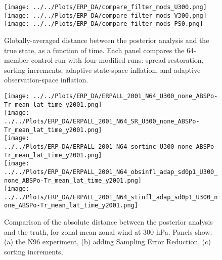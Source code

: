 \documentclass[11pt]{report}
\begin{document}
\begin{figure}
  \noindent
  \texttt{[image: ../../Plots/ERP\_DA/compare\_filter\_mods\_U300.png]} \\
  \texttt{[image: ../../Plots/ERP\_DA/compare\_filter\_mods\_V300.png]} \\
  \texttt{[image: ../../Plots/ERP\_DA/compare\_filter\_mods\_PS0.png]} 
   \caption{Globally-averaged distance between the posterior analysis and the true state, as a function of time.  Each panel compares the 64-member control run with four modified runs: spread restoration, sorting increments, adaptive state-space inflation, and adaptive observation-space inflation.}
   \label{fig:comp_mods_U300}
 \end{figure}


\begin{figure}
  \noindent
  \texttt{[image: ../../Plots/ERP\_DA/ERPALL\_2001\_N64\_U300\_none\_ABSPo-Tr\_mean\_lat\_time\_y2001.png]} \\
  \texttt{[image: ../../Plots/ERP\_DA/ERPALL\_2001\_N64\_SR\_U300\_none\_ABSPo-Tr\_mean\_lat\_time\_y2001.png]} \\
  \texttt{[image: ../../Plots/ERP\_DA/ERPALL\_2001\_N64\_sortinc\_U300\_none\_ABSPo-Tr\_mean\_lat\_time\_y2001.png]} \\
  \texttt{[image: ../../Plots/ERP\_DA/ERPALL\_2001\_N64\_obsinfl\_adap\_sd0p1\_U300\_none\_ABSPo-Tr\_mean\_lat\_time\_y2001.png]} \\
  \texttt{[image: ../../Plots/ERP\_DA/ERPALL\_2001\_N64\_stinfl\_adap\_sd0p1\_U300\_none\_ABSPo-Tr\_mean\_lat\_time\_y2001.png]} \\
   \caption{Comparison of the absolute distance between the posterior analysis and the truth, for zonal-mean zonal wind at 300 hPa.  Panels show: (a) the N96 experiment, (b) adding Sampling Error Reduction, (c) sorting increments,}
   \label{fig:U300}
 \end{figure}


\newpage
\end{document}
